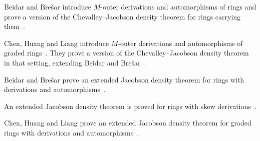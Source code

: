 Beidar and Bre\v{s}ar introduce $M$-outer derivations and automorphisms of
rings and prove a version of the Chevalley--Jacobson density theorem for rings
carrying them~\cite{WlExtendedJacobsonDensityTheorem2001}.

Chen, Huang and Liang introduce $M$-outer derivations and automorphisms of
graded rings~\cite{WlExtendedJacobsonDensityTheorem2010}. They prove a version of the Chevalley--Jacobson density theorem
in
that setting, extending Beidar and
Bre\v{s}ar~\cite{WlExtendedJacobsonDensityTheorem2010}.

Beidar and Bre\v{s}ar prove an extended Jacobson density theorem for rings
with derivations and
automorphisms~\cite{WlExtendedJacobsonDensityTheorem2020}.

An extended Jacobson density theorem is proved for rings with skew
derivations~\cite{WlExtendedJacobsonDensityTheorem2020}.

Chen, Huang and Liang prove an extended Jacobson density theorem for graded
rings with derivations and
automorphisms~\cite{WlExtendedJacobsonDensityTheorem2020}.
